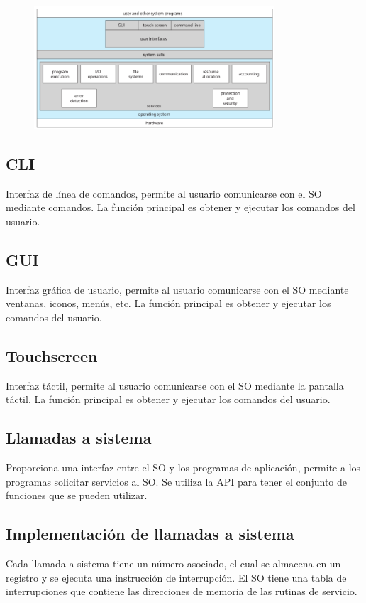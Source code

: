 \documentclass{templateNote}
\begin{document}
\begin{figure}[H]
    \centering
    \includegraphics[width=0.8\textwidth]{img/servicios.png}
\end{figure}

\subsection*{CLI}
Interfaz de línea de comandos, permite al usuario comunicarse con el SO mediante comandos. La función principal es obtener y ejecutar los comandos del usuario.

\subsection*{GUI}
Interfaz gráfica de usuario, permite al usuario comunicarse con el SO mediante ventanas, iconos, menús, etc. La función principal es obtener y ejecutar los comandos del usuario.

\subsection*{Touchscreen}
Interfaz táctil, permite al usuario comunicarse con el SO mediante la pantalla táctil. La función principal es obtener y ejecutar los comandos del usuario.

\subsection*{Llamadas a sistema}
Proporciona una interfaz entre el SO y los programas de aplicación, permite a los programas solicitar servicios al SO. Se utiliza la API para tener el conjunto de funciones que se pueden utilizar.

\subsection*{Implementación de llamadas a sistema}
Cada llamada a sistema tiene un número asociado, el cual se almacena en un registro y se ejecuta una instrucción de interrupción. El SO tiene una tabla de interrupciones que contiene las direcciones de memoria de las rutinas de servicio.
\end{document}
